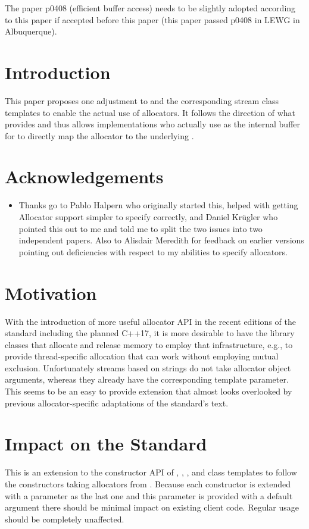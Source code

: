\documentclass[ebook,11pt,article]{memoir}
\begin{document}
The paper p0408 (efficient buffer access) needs to be slightly adopted according to this paper if accepted before this paper (this paper passed p0408 in LEWG in Albuquerque).


\chapter{Introduction}
This paper proposes one adjustment to  and the corresponding stream class templates to enable the actual use of allocators. It follows the direction of what  provides and thus allows implementations who actually use  as the internal buffer for  to directly map the allocator to the underlying .

\chapter{Acknowledgements}
\begin{itemize}
\item Thanks go to Pablo Halpern who originally started this, helped with getting Allocator support simpler to specify correctly, and Daniel Kr\"ugler who pointed this out to me and told me to split the two issues into two independent papers. Also to Alisdair Meredith for feedback on earlier versions pointing out deficiencies with respect to my abilities to specify allocators.
\end{itemize}

\chapter{Motivation}
With the introduction of more useful allocator API in the recent editions of the standard including the planned C++17, it is more desirable to have the library classes that allocate and release memory to employ that infrastructure, e.g., to provide thread-specific allocation that can work without employing mutual exclusion. Unfortunately streams based on strings do not take allocator object arguments, whereas they already have the corresponding template parameter. This seems to be an easy to provide extension that almost looks overlooked by previous allocator-specific adaptations of the standard's text.
\begin{codeblock}
\end{codeblock}

\chapter{Impact on the Standard}
This is an extension to the constructor API of , , , and  class templates to follow the constructors taking allocators from . Because each constructor is extended with a parameter as the last one and this parameter is provided with a default argument there should be minimal impact on existing client code. Regular usage should be completely unaffected. 
\end{document}
